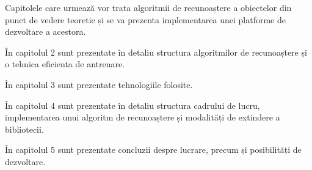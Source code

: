 Capitolele care urmează vor trata algoritmii de recunoaștere a obiectelor din punct de vedere teoretic și se va prezenta implementarea unei platforme de dezvoltare a acestora.

În capitolul 2 sunt prezentate în detaliu structura algoritmilor de recunoaștere și o tehnica eficienta de antrenare.

În capitolul 3 sunt prezentate tehnologiile folosite.

În capitolul 4 sunt prezentate în detaliu structura cadrului de lucru, implementarea unui algoritm de recunoaștere și modalități de extindere a bibliotecii.

În capitolul 5 sunt prezentate concluzii despre lucrare, precum și posibilități de dezvoltare.

\pagebreak